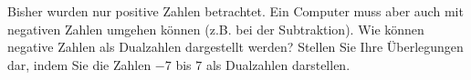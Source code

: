 \begin{exercise}
Bisher wurden nur positive Zahlen betrachtet. Ein Computer muss aber auch mit negativen Zahlen umgehen können (z.B. bei der Subtraktion). Wie können negative Zahlen als Dualzahlen dargestellt werden? Stellen Sie Ihre Überlegungen dar, indem Sie die Zahlen $-7$ bis $7$ als Dualzahlen darstellen.
\end{exercise}
